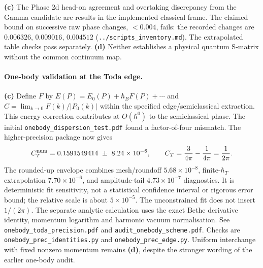 \documentclass[11pt,a4paper]{article}
\newcommand{\Lc}{\textsf{\textbf{(c)}}\xspace}
\newcommand{\Ld}{\textsf{\textbf{(d)}}\xspace}
\newcommand{\file}[1]{\nolinkurl{#1}}
\theoremstyle{remark}\newtheorem{remark}[proposition]{Remark}
\begin{document}
\Lc The Phase 2d head-on agreement and overtaking discrepancy from the Gamma
candidate are results in the implemented classical frame. The claimed bound
on successive raw phase changes, $<0.004$, fails: the recorded changes are
$0.006326$, $0.009016$, $0.004512$ (\file{../scripts_inventory.md}).
The extrapolated table checks pass separately. \Ld Neither establishes a
physical quantum S-matrix without the common continuum map.

\paragraph{One-body validation at the Toda edge.}
\Lc Define $F$ by $E(P)=E_0(P)+\hbar_B F(P)+\cdots$ and
$C=\lim_{k\to0}F(k)/|P_0(k)|$ within the specified edge/semiclassical
extraction. This energy correction contributes at $O(\hbar^0)$ to the
semiclassical phase. The initial \file{onebody_dispersion_test.pdf} found a
factor-of-four mismatch. The higher-precision package now gives
\[
 C_T^{\rm num}=0.1591549414\ \pm\ 8.24\times10^{-6},\qquad
 C_T=\frac{3}{4\pi}-\frac{1}{4\pi}=\frac{1}{2\pi}.
\]
The rounded-up envelope combines mesh/roundoff $5.68\times10^{-8}$,
finite-$\hbar_T$ extrapolation $7.70\times10^{-6}$, and amplitude-tail
$4.73\times10^{-7}$ diagnostics. It is deterministic fit sensitivity, not a
statistical confidence interval or rigorous error bound; the relative scale is
about $5\times10^{-5}$. The unconstrained fit does not insert $1/(2\pi)$.
The separate analytic calculation uses the exact Bethe derivative identity,
momentum logarithm and harmonic vacuum normalisation. See
\file{onebody_toda_precision.pdf} and \file{audit_onebody_scheme.pdf}.
Checks are \file{onebody_prec_identities.py} and \file{onebody_prec_edge.py}.
Uniform interchange with fixed nonzero
momentum remains \Ld, despite the stronger wording of the earlier one-body audit.
\end{document}
